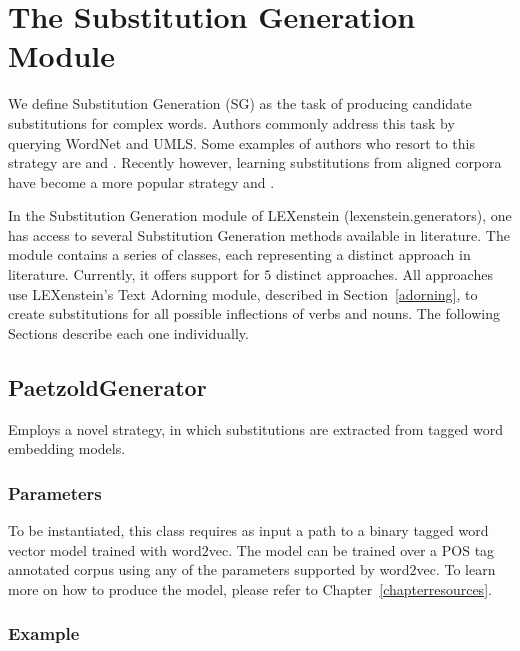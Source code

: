 \chapter{The Substitution Generation Module}
\label{sg}

We define Substitution Generation (SG) as the task of producing candidate substitutions for complex words. Authors commonly address this task by querying WordNet \cite{wordnet} and UMLS\cite{Bodenreider04}. Some examples of authors who resort to this strategy are \cite{Devlin1998} and \cite{Carroll99}. Recently however, learning substitutions from aligned corpora have become a more popular strategy \cite{Paetzold2013} and \cite{Horn2014}.

In the Substitution Generation module of LEXenstein (lexenstein.generators), one has access to several Substitution Generation methods available in literature. The module contains a series of classes, each representing a distinct approach in literature. Currently, it offers support for $5$ distinct approaches. All approaches use LEXenstein's Text Adorning module, described in Section~\ref{adorning}, to create substitutions for all possible inflections of verbs and nouns. The following Sections describe each one individually.








\section{PaetzoldGenerator}

Employs a novel strategy, in which substitutions are extracted from tagged word embedding models.

\subsection{Parameters}

To be instantiated, this class requires as input a path to a binary tagged word vector model trained with word$2$vec. The model can be trained over a POS tag annotated corpus using any of the parameters supported by word$2$vec. To learn more on how to produce the model, please refer to Chapter~\ref{chapterresources}.



\subsection{Example}

